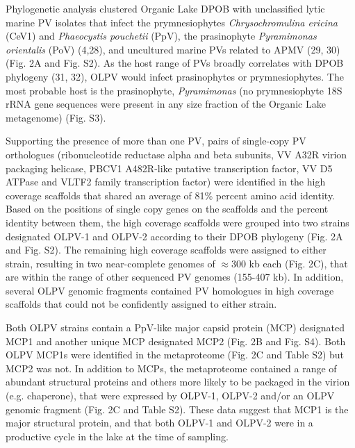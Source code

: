 Phylogenetic analysis clustered Organic Lake DPOB with unclassified lytic marine PV isolates that infect the prymnesiophytes \textit{Chrysochromulina ericina} (CeV1) and \textit{Phaeocystis pouchetii} (PpV),
 the prasinophyte \textit{Pyramimonas orientalis} (PoV) (4,28), and uncultured marine PVs related to APMV (29, 30) (Fig. 2A and Fig. S2). 
As the host range of PVs broadly correlates with DPOB phylogeny (31, 32), OLPV would infect prasinophytes or prymnesiophytes. 
The most probable host is the prasinophyte, \textit{Pyramimonas} (no prymnesiophyte 18S rRNA gene sequences were present in any size fraction of the Organic Lake metagenome) (Fig. S3).

Supporting the presence of more than one PV, pairs of single-copy PV orthologues 
(ribonucleotide reductase alpha and beta subunits, VV A32R virion packaging helicase, PBCV1 A482R-like putative transcription factor, VV D5 ATPase and VLTF2 family transcription factor) 
were identified in the high coverage scaffolds that shared an average of 81\% percent amino acid identity.
 Based on the positions of single copy genes on the scaffolds and the percent identity between them, the high coverage scaffolds were grouped into two strains designated OLPV-1 and OLPV-2 according to their DPOB phylogeny (Fig. 2A and Fig. S2).
 The remaining high coverage scaffolds were assigned to either strain, resulting in two near-complete genomes of $\approx$300 kb each (Fig. 2C), 
that are within the range of other sequenced PV genomes (155-407 kb). 
In addition, several OLPV genomic fragments contained PV homologues in high coverage scaffolds that could not be confidently assigned to either strain. 

Both OLPV strains contain a PpV-like major capsid protein (MCP) designated MCP1 and another unique MCP designated MCP2 (Fig. 2B and Fig. S4). 
Both OLPV MCP1s were identified in the metaproteome (Fig. 2C and Table S2) but MCP2 was not. 
In addition to MCPs, the metaproteome contained a range of abundant structural proteins and others more likely to be packaged in the virion (e.g. chaperone), that were expressed by OLPV-1, OLPV-2 and/or an OLPV genomic fragment (Fig. 2C and Table S2). 
These data suggest that MCP1 is the major structural protein, and that both OLPV-1 and OLPV-2 were in a productive cycle in the lake at the time of sampling. 

